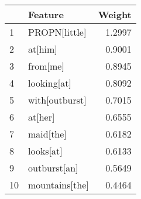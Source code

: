 \begin{tabular}{llr}
\toprule
{} &         Feature &  Weight \\
\midrule
1  &   PROPN[little] &  1.2997 \\
2  &         at[him] &  0.9001 \\
3  &        from[me] &  0.8945 \\
4  &     looking[at] &  0.8092 \\
5  &  with[outburst] &  0.7015 \\
6  &         at[her] &  0.6555 \\
7  &       maid[the] &  0.6182 \\
8  &       looks[at] &  0.6133 \\
9  &    outburst[an] &  0.5649 \\
10 &  mountains[the] &  0.4464 \\
\bottomrule
\end{tabular}
